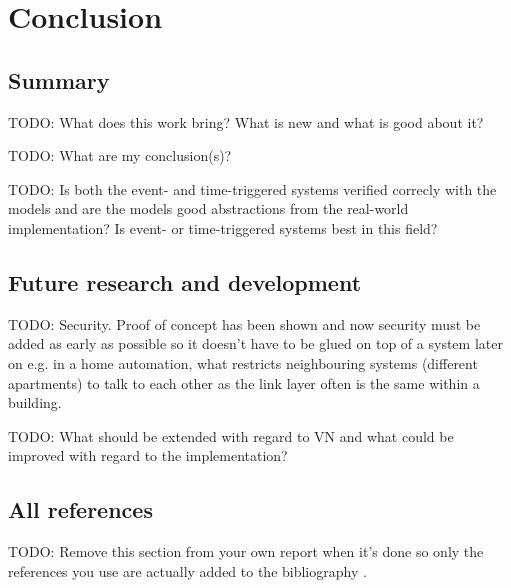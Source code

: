 \chapter{Conclusion}
\section{Summary}
TODO: What does this work bring? What is new and what is good about it?

TODO: What are my conclusion(s)?

TODO: Is both the event- and time-triggered systems verified correcly with the
models and are the models good abstractions from the real-world implementation?
Is event- or time-triggered systems best in this field?

\section{Future research and development}
TODO: Security. Proof of concept has been shown and now security must be added
as early as possible so it doesn't have to be glued on top of a system later on
e.g. in a home automation, what restricts neighbouring systems (different
apartments) to talk to each other as the link layer often is the same within a
building.

TODO: What should be extended with regard to VN and what could be improved with
regard to the implementation?

\section{All references}
TODO: Remove this section from your own report when it's done so only the
references you use are actually added to the bibliography \cite{*}.
